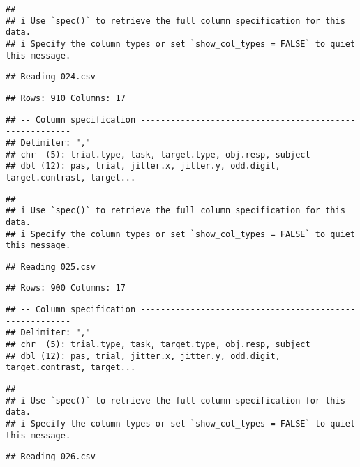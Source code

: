 \documentclass[
]{article}
\begin{document}
\begin{verbatim}
## 
## i Use `spec()` to retrieve the full column specification for this data.
## i Specify the column types or set `show_col_types = FALSE` to quiet this message.
\end{verbatim}

\begin{verbatim}
## Reading 024.csv
\end{verbatim}

\begin{verbatim}
## Rows: 910 Columns: 17
\end{verbatim}

\begin{verbatim}
## -- Column specification --------------------------------------------------------
## Delimiter: ","
## chr  (5): trial.type, task, target.type, obj.resp, subject
## dbl (12): pas, trial, jitter.x, jitter.y, odd.digit, target.contrast, target...
\end{verbatim}

\begin{verbatim}
## 
## i Use `spec()` to retrieve the full column specification for this data.
## i Specify the column types or set `show_col_types = FALSE` to quiet this message.
\end{verbatim}

\begin{verbatim}
## Reading 025.csv
\end{verbatim}

\begin{verbatim}
## Rows: 900 Columns: 17
\end{verbatim}

\begin{verbatim}
## -- Column specification --------------------------------------------------------
## Delimiter: ","
## chr  (5): trial.type, task, target.type, obj.resp, subject
## dbl (12): pas, trial, jitter.x, jitter.y, odd.digit, target.contrast, target...
\end{verbatim}

\begin{verbatim}
## 
## i Use `spec()` to retrieve the full column specification for this data.
## i Specify the column types or set `show_col_types = FALSE` to quiet this message.
\end{verbatim}

\begin{verbatim}
## Reading 026.csv
\end{verbatim}
\end{document}
